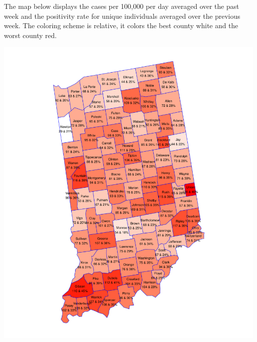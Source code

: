\documentclass[
]{article}
\begin{document}
The map below displays the cases per 100,000 per day averaged over the
past week and the positivity rate for unique individuals averaged over
the previous week. The coloring scheme is relative, it colors the best
county white and the worst county red.

\includegraphics{Grace_internal4_files/figure-latex/unnamed-chunk-19-1.pdf}
\end{document}
